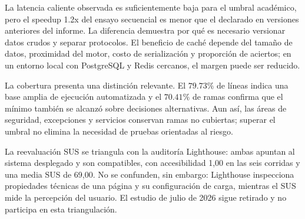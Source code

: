 \documentclass[11pt,a4paper]{report}
\begin{document}
La latencia caliente observada es suficientemente baja para el umbral académico, pero el speedup 1.2x del ensayo secuencial es menor que el declarado en versiones anteriores del informe. La diferencia demuestra por qué es necesario versionar datos crudos y separar protocolos. El beneficio de caché depende del tamaño de datos, proximidad del motor, costo de serialización y proporción de aciertos; en un entorno local con PostgreSQL y Redis cercanos, el margen puede ser reducido.

La cobertura presenta una distinción relevante. El $79.73\%$ de líneas indica una base amplia de ejecución automatizada y el $70.41\%$ de ramas confirma que el mínimo también se alcanzó sobre decisiones alternativas. Aun así, las áreas de seguridad, excepciones y servicios conservan ramas no cubiertas; superar el umbral no elimina la necesidad de pruebas orientadas al riesgo.

La reevaluación SUS se triangula con la auditoría Lighthouse: ambas apuntan al sistema desplegado y son compatibles, con accesibilidad 1,00 en las seis corridas y una media SUS de 69,00. No se confunden, sin embargo: Lighthouse inspecciona propiedades técnicas de una página y su configuración de carga, mientras el SUS mide la percepción del usuario. El estudio de julio de 2026 sigue retirado y no participa en esta triangulación.

\end{document}
